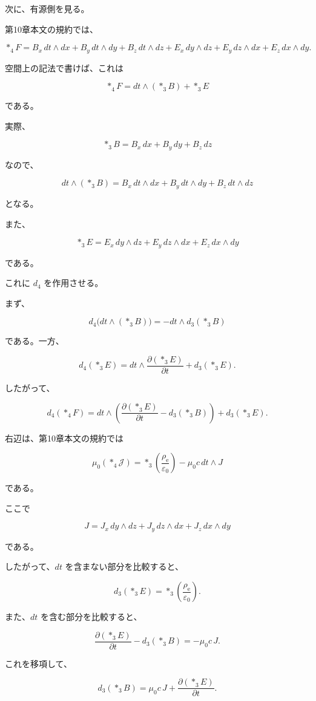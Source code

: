 \documentclass[a4paper,12pt,openany]{book}
\begin{document}
次に、有源側を見る。

第10章本文の規約では、

\[
\ast_4F= B_x\,dt\wedge dx+B_y\,dt\wedge dy+B_z\,dt\wedge dz+E_x\,dy\wedge dz+E_y\,dz\wedge dx+E_z\,dx\wedge dy.
\]

空間上の記法で書けば、これは

\[
\ast_4F=dt\wedge(\ast_3B)+\ast_3E
\]

である。

実際、

\[
\ast_3B=B_x\,dx+B_y\,dy+B_z\,dz
\]

なので、

\[
dt\wedge(\ast_3B)=B_x\,dt\wedge dx+B_y\,dt\wedge dy+B_z\,dt\wedge dz
\]

となる。

また、

\[
\ast_3E=E_x\,dy\wedge dz+E_y\,dz\wedge dx+E_z\,dx\wedge dy
\]

である。

これに \(d_4\) を作用させる。

まず、

\[
d_4\bigl(dt\wedge(\ast_3B)\bigr)=-dt\wedge d_3(\ast_3B)
\]

である。一方、

\[
d_4(\ast_3E)=dt\wedge\frac{\partial(\ast_3E)}{\partial t}+d_3(\ast_3E).
\]

したがって、

\[
d_4(\ast_4F)=dt\wedge\left(\frac{\partial(\ast_3E)}{\partial t}-d_3(\ast_3B)\right)+d_3(\ast_3E).
\]

右辺は、第10章本文の規約では

\[
\mu_0(\ast_4\mathcal J)=\ast_3\left(\frac{\rho_{\mathrm e}}{\varepsilon_0}\right)-\mu_0 c\,dt\wedge J
\]

である。

ここで

\[
J=J_x\,dy\wedge dz+J_y\,dz\wedge dx+J_z\,dx\wedge dy
\]

である。

したがって、\(dt\) を含まない部分を比較すると、

\[
d_3(\ast_3E)=\ast_3\left(\frac{\rho_{\mathrm e}}{\varepsilon_0}\right).
\]

また、\(dt\) を含む部分を比較すると、

\[
\frac{\partial(\ast_3E)}{\partial t}-d_3(\ast_3B)=-\mu_0 c\,J.
\]

これを移項して、

\[
d_3(\ast_3B)=\mu_0 c\,J+\frac{\partial(\ast_3E)}{\partial t}.
\]
\end{document}
